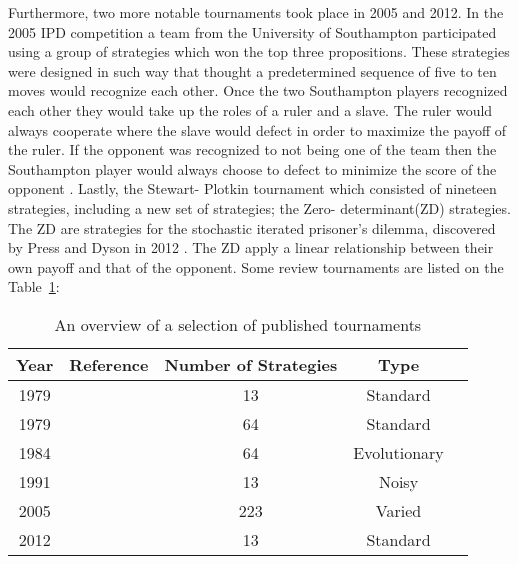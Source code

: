 Furthermore, two more notable tournaments took place in 2005 and 2012.
In the 2005 IPD competition a team from the University of Southampton participated
using a group of strategies which won the top three propositions. These strategies
were designed in such way that thought a predetermined sequence of five to ten
moves would recognize each other. Once the two Southampton players recognized
each other they would take up the roles of a ruler and a slave. The ruler
would always cooperate where the slave would defect in order to maximize the
payoff of the ruler. If the opponent was recognized to not being one of the team
then the Southampton player would always choose to defect to minimize the score
of the opponent \cite{Li2011}. Lastly, the Stewart- Plotkin \cite{Stewart2012}
tournament which
consisted of nineteen strategies, including a new set of strategies; the Zero-
determinant(ZD) strategies. The ZD are strategies for the stochastic iterated
prisoner's dilemma, discovered by Press and Dyson in 2012 \cite{Press2012a}.
The ZD apply a linear relationship between their own payoff and that of the opponent.
Some review tournaments are listed on the Table~\ref{tab:tournaments}:

\begin{table}[!hbtp]
    \begin{center}
        \begin{tabular}{ccccc}
            \toprule
            Year     & Reference                  & Number of Strategies & Type     \\
            \midrule
            1979     & \cite{Axelrod1980a}        & 13                   & Standard  \\
            1979     & \cite{Axelrod1980b}        & 64                   & Standard  \\
            1984     & \cite{Axelrod1981}         & 64                   & Evolutionary\\
            1991     & \cite{The2016}             & 13                   & Noisy     \\
            2005     & \cite{Chong2004}           & 223                  & Varied    \\
            2012     & \cite{Stewart2012}         & 13                   & Standard   \\
            \bottomrule
        \end{tabular}
    \end{center}
    \caption{An overview of a selection of published tournaments}\label{tab:tournaments}
\end{table}

